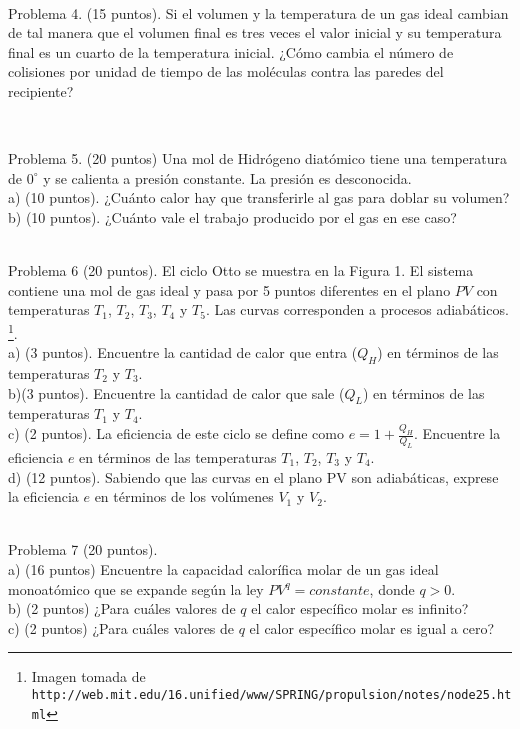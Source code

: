 \documentclass{article}
\begin{document}
\

Problema 4. (15 puntos). Si el volumen y la temperatura de un gas ideal
cambian de tal manera que el volumen final es tres veces el valor inicial y
su temperatura final es un cuarto de la temperatura inicial. ¿C\'omo cambia el n\'umero de colisiones por unidad de tiempo de las mol\'eculas contra las paredes del recipiente? 

\

Problema 5. (20 puntos) Una mol de Hidr\'ogeno diat\'omico tiene una
temperatura de $0^{\circ}$ y se calienta a presi\'on constante. La
presi\'on es desconocida.\\
%
a) (10 puntos). ¿Cu\'anto calor hay que transferirle al gas para doblar su volumen?\\
b) (10 puntos). ¿Cu\'anto vale el trabajo producido por el gas en ese caso?\\




\

Problema 6 (20 puntos). El ciclo Otto se muestra en la Figura 1. El
sistema contiene una mol de gas ideal y pasa por 5 puntos diferentes
en el plano $PV$ con temperaturas $T_1$, $T_2$, $T_3$, $T_4$ y
$T_5$.
  Las curvas corresponden a procesos adiab\'aticos. \footnote{Imagen
    tomada de
    \verb"http://web.mit.edu/16.unified/www/SPRING/propulsion/notes/node25.html"}. \\
a) (3 puntos). Encuentre la cantidad de calor que entra ($Q_H$) en t\'erminos de las
  temperaturas $T_2$ y $T_3$.\\
b)(3 puntos). Encuentre la cantidad de calor que sale ($Q_L$) en t\'erminos de las
  temperaturas $T_1$ y $T_4$.\\
c) (2 puntos). La eficiencia de este ciclo se define como $e =
  1+\frac{Q_H}{Q_{L}}$. Encuentre la eficiencia $e$ en t\'erminos de las
  temperaturas $T_1$, $T_2$, $T_3$ y $T_4$.\\
d) (12 puntos). Sabiendo que las curvas en el plano PV son adiab\'aticas,
  exprese la eficiencia $e$ en t\'erminos de los vol\'umenes $V_1$ y
  $V_2$. \\



\

Problema 7 (20 puntos).\\
a) (16 puntos) Encuentre la capacidad calor\'ifica molar de un gas
ideal monoat\'omico que se expande seg\'un la ley $PV^{q}=constante$,
donde $q>0$.\\
b) (2 puntos) ¿Para cu\'ales valores de $q$ el calor espec\'ifico molar es infinito?\\
c) (2 puntos) ¿Para cu\'ales valores de $q$ el calor espec\'ifico molar es igual a cero?  \\
\end{document}
